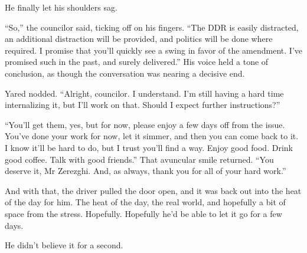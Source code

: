 He finally let his shoulders sag.

``So,'' the councilor said, ticking off on his fingers. ``The DDR is easily distracted, an additional distraction will be provided, and politics will be done where required. I promise that you'll quickly see a swing in favor of the amendment. I've promised such in the past, and surely delivered.'' His voice held a tone of conclusion, as though the conversation was nearing a decisive end.

Yared nodded. ``Alright, councilor. I understand. I'm still having a hard time internalizing it, but I'll work on that. Should I expect further instructions?''

``You'll get them, yes, but for now, please enjoy a few days off from the issue. You've done your work for now, let it simmer, and then you can come back to it. I know it'll be hard to do, but I trust you'll find a way. Enjoy good food. Drink good coffee. Talk with good friends.'' That avuncular smile returned. ``You deserve it, Mr Zerezghi. And, as always, thank you for all of your hard work.''

And with that, the driver pulled the door open, and it was back out into the heat of the day for him. The heat of the day, the real world, and hopefully a bit of space from the stress. Hopefully. Hopefully he'd be able to let it go for a few days.

He didn't believe it for a second.

